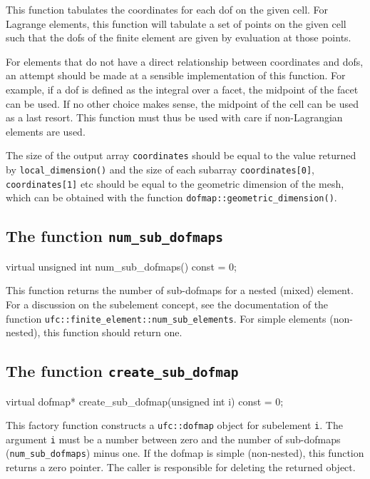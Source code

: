 This function tabulates the coordinates for each dof on the given
cell. For Lagrange elements, this function will tabulate a set of
points on the given cell such that the dofs of the finite element are
given by evaluation at those points.

For elements that do not have a direct relationship between
coordinates and dofs, an attempt should be made at a sensible
implementation of this function. For example, if a dof is defined as
the integral over a facet, the midpoint of the facet can be used. If
no other choice makes sense, the midpoint of the cell can be used as a
last resort. This function must thus be used with care if
non-Lagrangian elements are used.

The size of the output array \texttt{coordinates} should be equal to
the value returned by \texttt{local\_dimension()} and the size of each
subarray \texttt{coordi\-nates[0]}, \texttt{coordinates[1]} etc should
be equal to the geometric dimension of the mesh, which can be obtained
with the function \texttt{dofmap::geometric\_\-dimension()}.

\subsection{The function \texttt{num\_sub\_dofmaps}}

\begin{code}
virtual unsigned int num_sub_dofmaps() const = 0;
\end{code}

This function returns the number of sub-dofmaps for a nested (mixed)
element. For a discussion on the subelement concept, see the
documentation of the function
\texttt{ufc::finite\_element::num\_sub\_elements}. For simple
elements (non-nested), this function should return one.

\subsection{The function \texttt{create\_sub\_dofmap}}

\begin{code}
virtual dofmap* create_sub_dofmap(unsigned int i) const = 0;
\end{code}

This factory function constructs a \texttt{ufc::dofmap} object for
subelement \texttt{i}. The argument \texttt{i} must be a number
between zero and the number of sub-dofmaps
(\texttt{num\_sub\_dofmaps}) minus one. If the dofmap is simple
(non-nested), this function returns a zero pointer. The caller is
responsible for deleting the returned object.

